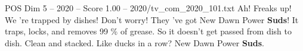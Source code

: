 \begin{textsample}{POS Dim 5 – 2020 – Score 1.00 – 2020/tv\_com\_2020\_101.txt}  \label{ex:f5_pos_038}
Ah!
Freaks up!
We 're trapped by dishes!
Don't worry!
They 've got New Dawn Power \textbf{Suds}!
It traps, locks, and removes 99 \% of grease.
So it doesn't get passed from dish to dish.
Clean and stacked.
Like ducks in a row?
New Dawn Power \textbf{Suds}.

\end{textsample}
